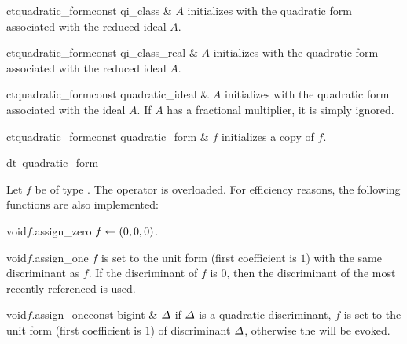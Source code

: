 \begin{fcode}{ct}{quadratic_form}{const qi_class & $A$}
  initializes with the quadratic form associated with the reduced ideal $A$.
\end{fcode}

\begin{fcode}{ct}{quadratic_form}{const qi_class_real & $A$}
  initializes with the quadratic form associated with the reduced ideal $A$.
\end{fcode}

\begin{fcode}{ct}{quadratic_form}{const quadratic_ideal & $A$}
  initializes with the quadratic form associated with the ideal $A$.  If $A$ has a fractional
  multiplier, it is simply ignored.
\end{fcode}

\begin{fcode}{ct}{quadratic_form}{const quadratic_form & $f$}
  initializes a copy of $f$.
\end{fcode}

\begin{fcode}{dt}{~quadratic_form}{}
\end{fcode}






\ASGN

Let $f$ be of type .  The operator \code{=} is overloaded.  For efficiency
reasons, the following functions are also implemented:

\begin{fcode}{void}{$f$.assign_zero}{}
  $f \leftarrow (0,0,0)$.
\end{fcode}

\begin{fcode}{void}{$f$.assign_one}{}
  $f$ is set to the unit form (first coefficient is $1$) with the same discriminant as $f$.  If
  the discriminant of $f$ is $0$, then the discriminant of the most recently referenced
   is used.
\end{fcode}

\begin{fcode}{void}{$f$.assign_one}{const bigint & $\varDelta$}
  if $\varDelta$ is a quadratic discriminant, $f$ is set to the unit form (first coefficient is $1$) of
  discriminant $\varDelta$, otherwise the \LEH will be evoked.
\end{fcode}

